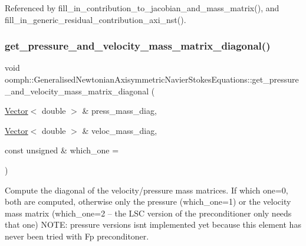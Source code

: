Referenced by fill\+\_\+in\+\_\+contribution\+\_\+to\+\_\+jacobian\+\_\+and\+\_\+mass\+\_\+matrix(), and fill\+\_\+in\+\_\+generic\+\_\+residual\+\_\+contribution\+\_\+axi\+\_\+nst().

\mbox{\label{classoomph_1_1GeneralisedNewtonianAxisymmetricNavierStokesEquations_a0c4bd2fe53aee0df4fa9b2bf57fb6a89}} 
\subsubsection{\texorpdfstring{get\+\_\+pressure\+\_\+and\+\_\+velocity\+\_\+mass\+\_\+matrix\+\_\+diagonal()}{get\_pressure\_and\_velocity\_mass\_matrix\_diagonal()}}
{\footnotesize\ttfamily void oomph\+::\+Generalised\+Newtonian\+Axisymmetric\+Navier\+Stokes\+Equations\+::get\+\_\+pressure\+\_\+and\+\_\+velocity\+\_\+mass\+\_\+matrix\+\_\+diagonal (\begin{DoxyParamCaption}\item[{\hyperlink{classoomph_1_1Vector}{Vector}$<$ double $>$ \&}]{press\+\_\+mass\+\_\+diag,  }\item[{\hyperlink{classoomph_1_1Vector}{Vector}$<$ double $>$ \&}]{veloc\+\_\+mass\+\_\+diag,  }\item[{const unsigned \&}]{which\+\_\+one = {} }\end{DoxyParamCaption})\hspace{0.3cm}{\ttfamily [virtual]}}



Compute the diagonal of the velocity/pressure mass matrices. If which one=0, both are computed, otherwise only the pressure (which\+\_\+one=1) or the velocity mass matrix (which\+\_\+one=2 -- the L\+SC version of the preconditioner only needs that one) N\+O\+TE\+: pressure versions isn\textquotesingle{}t implemented yet because this element has never been tried with Fp preconditoner. 

